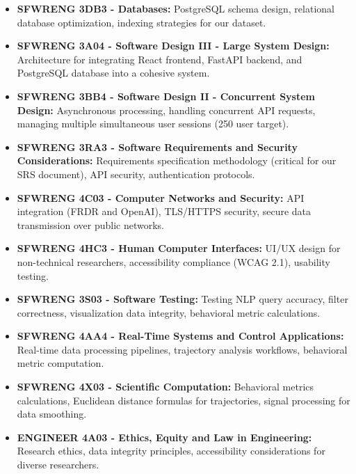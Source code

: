 \documentclass{article}
\begin{document}
\begin{itemize}
    \item \textbf{SFWRENG 3DB3 - Databases:} PostgreSQL schema design, relational database optimization, indexing strategies for our dataset.
    
    \item \textbf{SFWRENG 3A04 - Software Design III - Large System Design:} Architecture for integrating React frontend, FastAPI backend, and PostgreSQL database into a cohesive system.
    
    \item \textbf{SFWRENG 3BB4 - Software Design II - Concurrent System Design:} Asynchronous processing, handling concurrent API requests, managing multiple simultaneous user sessions (250 user target).
    
    \item \textbf{SFWRENG 3RA3 - Software Requirements and Security Considerations:} Requirements specification methodology (critical for our SRS document), API security, authentication protocols.
    
    \item \textbf{SFWRENG 4C03 - Computer Networks and Security:} API integration (FRDR and OpenAI), TLS/HTTPS security, secure data transmission over public networks.
    
    \item \textbf{SFWRENG 4HC3 - Human Computer Interfaces:} UI/UX design for non-technical researchers, accessibility compliance (WCAG 2.1), usability testing.
        
    \item \textbf{SFWRENG 3S03 - Software Testing:} Testing NLP query accuracy, filter correctness, visualization data integrity, behavioral metric calculations.
    
    \item \textbf{SFWRENG 4AA4 - Real-Time Systems and Control Applications:} Real-time data processing pipelines, trajectory analysis workflows, behavioral metric computation.
    
    \item \textbf{SFWRENG 4X03 - Scientific Computation:} Behavioral metrics calculations, Euclidean distance formulas for trajectories, signal processing for data smoothing.
    
    \item \textbf{ENGINEER 4A03 - Ethics, Equity and Law in Engineering:} Research ethics, data integrity principles, accessibility considerations for diverse researchers.
\end{itemize}
\end{document}
